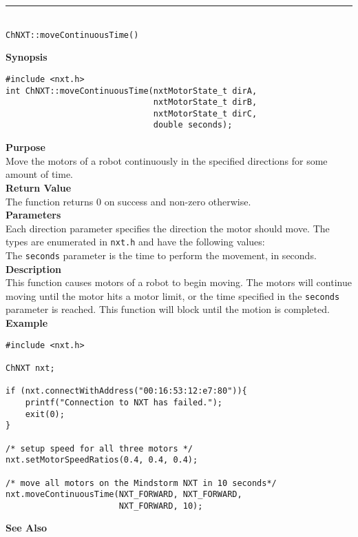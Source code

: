 \noindent
\vspace{5pt}
\rule{4.5in}{0.015in}\\
\noindent
{\LARGE \texttt{ChNXT::moveContinuousTime()} }\\


\noindent
{\bf Synopsis}
\begin{lstlisting}
#include <nxt.h>
int ChNXT::moveContinuousTime(nxtMotorState_t dirA, 
                              nxtMotorState_t dirB, 
                              nxtMotorState_t dirC, 
                              double seconds);
\end{lstlisting}

\noindent
{\bf Purpose}\\
Move the motors of a robot continuously in the specified directions for some amount of time.\\

\noindent
{\bf Return Value}\\
The function returns 0 on success and non-zero otherwise.\\

\noindent
{\bf Parameters}\\
Each direction parameter specifies the direction the motor should 
move. The types are enumerated in \texttt{nxt.h} and have the 
following values:\\  
\noindent
The \texttt{seconds} parameter is the time to perform the movement, in seconds.
\\

\noindent
{\bf Description}\\
This function causes motors of a robot to begin moving. The motors
will continue moving until the motor hits a motor limit, or the 
time specified in the \texttt{seconds} parameter is reached. This 
function will block until the motion is completed.\\

\noindent
{\bf Example}
\begin{lstlisting}
#include <nxt.h> 

ChNXT nxt;

if (nxt.connectWithAddress("00:16:53:12:e7:80")){
    printf("Connection to NXT has failed.");
    exit(0);
}
 
/* setup speed for all three motors */
nxt.setMotorSpeedRatios(0.4, 0.4, 0.4);

/* move all motors on the Mindstorm NXT in 10 seconds*/
nxt.moveContinuousTime(NXT_FORWARD, NXT_FORWARD, 
                       NXT_FORWARD, 10);
\end{lstlisting}

\noindent
{\bf See Also}\\
